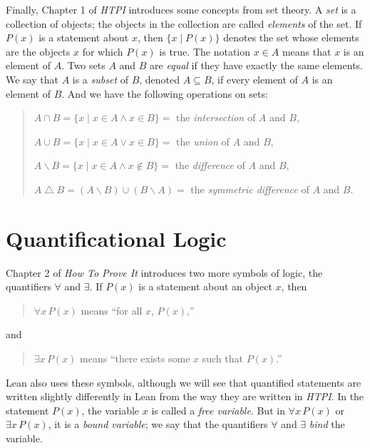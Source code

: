 \documentclass[
  letterpaper,
  DIV=11,
  numbers=noendperiod]{scrreprt}
\begin{document}
Finally, Chapter 1 of \emph{HTPI} introduces some concepts from set
theory. A \emph{set} is a collection of objects; the objects in the
collection are called \emph{elements} of the set. If \(P(x)\) is a
statement about \(x\), then \(\{x \mid P(x)\}\) denotes the set whose
elements are the objects \(x\) for which \(P(x)\) is true. The notation
\(x \in A\) means that \(x\) is an element of \(A\). Two sets \(A\) and
\(B\) are \emph{equal} if they have exactly the same elements. We say
that \(A\) is a \emph{subset} of \(B\), denoted \(A \subseteq B\), if
every element of \(A\) is an element of \(B\). And we have the following
operations on sets:

\begin{quote}
\(A \cap B = \{x \mid x \in A \wedge x \in B\} = {}\) the
\emph{intersection} of \(A\) and \(B\),

\(A \cup B = \{x \mid x \in A \vee x \in B\} = {}\) the \emph{union} of
\(A\) and \(B\),

\(A \mathbin{\backslash} B = \{x \mid x \in A \wedge x \notin B\} = {}\)
the \emph{difference} of \(A\) and \(B\),

\(A \bigtriangleup B = (A \mathbin{\backslash} B) \cup (B \mathbin{\backslash} A) = {}\)
the \emph{symmetric difference} of \(A\) and \(B\).

\end{quote}


\hypertarget{quantificational-logic}{%
\chapter{Quantificational Logic}\label{quantificational-logic}}

Chapter 2 of \emph{How To Prove It} introduces two more symbols of
logic, the quantifiers \(\forall\) and \(\exists\). If \(P(x)\) is a
statement about an object \(x\), then

\begin{quote}
\(\forall x\,P(x)\) means ``for all \(x\), \(P(x)\),''

\end{quote}

and

\begin{quote}
\(\exists x\,P(x)\) means ``there exists some \(x\) such that
\(P(x)\).''

\end{quote}

Lean also uses these symbols, although we will see that quantified
statements are written slightly differently in Lean from the way they
are written in \emph{HTPI}. In the statement \(P(x)\), the variable
\(x\) is called a \emph{free variable}. But in \(\forall x\,P(x)\) or
\(\exists x\,P(x)\), it is a \emph{bound variable}; we say that the
quantifiers \(\forall\) and \(\exists\) \emph{bind} the variable.
\end{document}
